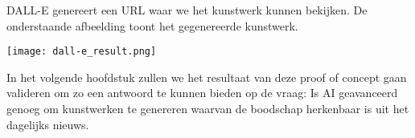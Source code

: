 DALL-E genereert een URL waar we het kunstwerk kunnen bekijken. De onderstaande afbeelding toont het gegenereerde kunstwerk.

\begin{center}
    \texttt{[image: dall-e\_result.png]}
    \label{fig:dall-e_result}
\end{center}

In het volgende hoofdstuk zullen we het resultaat van deze proof of concept gaan valideren om zo een antwoord te kunnen bieden op de vraag: Is AI geavanceerd genoeg om kunstwerken te genereren waarvan de boodschap herkenbaar is uit het dagelijks nieuws. 

